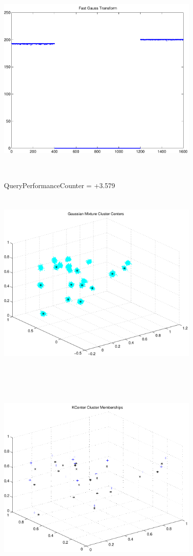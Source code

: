 \documentclass[9pt]{article}
\theoremstyle{plain}
\theoremstyle{definition}
\theoremstyle{remark}
\numberwithin{equation}{section}
\begin{document}
\includegraphics[width=10.0cm,height=10.0cm]{FGT4_Centers.pdf}

QueryPerformanceCounter  =  +3.579
\includegraphics[width=10.0cm,height=10.0cm]{GaussianMixture_ClusterCenters20_Centers.pdf}

\includegraphics[width=10.0cm,height=10.0cm]{KCenterClusterMemberships_20_Centers.pdf}
\end{document}

